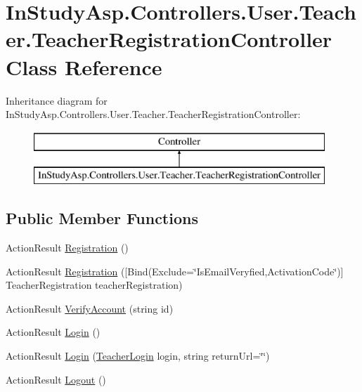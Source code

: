 \hypertarget{class_in_study_asp_1_1_controllers_1_1_user_1_1_teacher_1_1_teacher_registration_controller}{}\section{In\+Study\+Asp.\+Controllers.\+User.\+Teacher.\+Teacher\+Registration\+Controller Class Reference}
\label{class_in_study_asp_1_1_controllers_1_1_user_1_1_teacher_1_1_teacher_registration_controller}
Inheritance diagram for In\+Study\+Asp.\+Controllers.\+User.\+Teacher.\+Teacher\+Registration\+Controller\+:\begin{figure}[H]
\begin{center}
\leavevmode
\includegraphics[height=2.000000cm]{class_in_study_asp_1_1_controllers_1_1_user_1_1_teacher_1_1_teacher_registration_controller}
\end{center}
\end{figure}
\subsection*{Public Member Functions}
\begin{DoxyCompactItemize}
\item 
Action\+Result \hyperlink{class_in_study_asp_1_1_controllers_1_1_user_1_1_teacher_1_1_teacher_registration_controller_afb1dcb3b2a2511cf4fe4a129909ecbd2}{Registration} ()
\item 
Action\+Result \hyperlink{class_in_study_asp_1_1_controllers_1_1_user_1_1_teacher_1_1_teacher_registration_controller_a3ea2029bfd432a4f608d472569fea93f}{Registration} (\mbox{[}Bind(Exclude=\char`\"{}Is\+Email\+Veryfied,Activation\+Code\char`\"{})\mbox{]} Teacher\+Registration teacher\+Registration)
\item 
Action\+Result \hyperlink{class_in_study_asp_1_1_controllers_1_1_user_1_1_teacher_1_1_teacher_registration_controller_a722d8fc6094e16cddacd6318ee195de2}{Verify\+Account} (string id)
\item 
Action\+Result \hyperlink{class_in_study_asp_1_1_controllers_1_1_user_1_1_teacher_1_1_teacher_registration_controller_a8f5b53c1ab9d03840054ee43be913d38}{Login} ()
\item 
Action\+Result \hyperlink{class_in_study_asp_1_1_controllers_1_1_user_1_1_teacher_1_1_teacher_registration_controller_a30ca9e7d8bc106277af9148a2ede3280}{Login} (\hyperlink{class_in_study_asp_1_1_models_1_1_user_1_1_teacher_1_1_teacher_login}{Teacher\+Login} login, string return\+Url=\char`\"{}\char`\"{})
\item 
Action\+Result \hyperlink{class_in_study_asp_1_1_controllers_1_1_user_1_1_teacher_1_1_teacher_registration_controller_a6d4a0d17fe318c5c0f1df4437dbac597}{Logout} ()
\end{DoxyCompactItemize}


